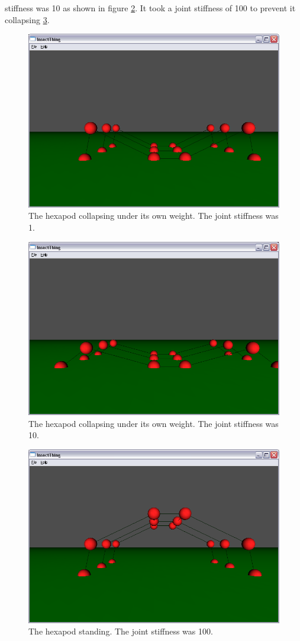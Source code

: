 stiffness was 10 as shown in figure \ref{Fig:JointStiffness10}. It took a joint
stiffness of 100 to prevent it collapsing \ref{Fig:StableJointStiffness100}.
\begin{figure}
\centering
\includegraphics[height=0.5\textheight]{JointStiffness1}
\caption{\label{Fig:JointStiffness1}The hexapod collapsing under its own weight. The
joint stiffness was 1.} 
\end{figure}
\begin{figure}
\centering
\includegraphics[height=0.5\textheight]{JointStiffness10}
\caption{\label{Fig:JointStiffness10}The hexapod collapsing under its own weight. The
joint stiffness was 10.} 
\end{figure}
\begin{figure}
\centering
\includegraphics[height=0.5\textheight]{StableJointStiffness100}
\caption{\label{Fig:StableJointStiffness100}The hexapod standing. The
joint stiffness was 100.} 
\end{figure}


